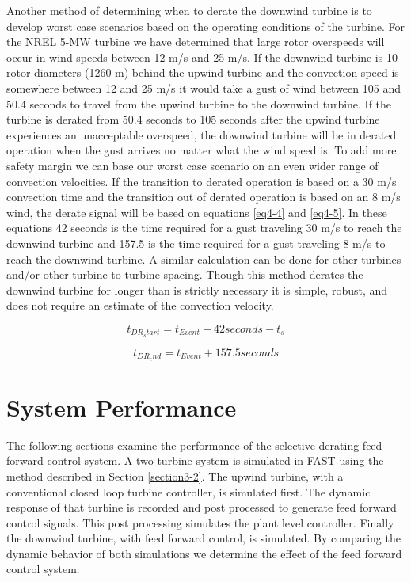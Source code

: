 Another method of determining when to derate the downwind turbine is to develop worst case scenarios based on the operating conditions of the turbine. For the NREL 5-MW turbine we have determined that large rotor overspeeds will occur in wind speeds between 12 m/s and 25 m/s. If the downwind turbine is 10 rotor diameters (1260 m) behind the upwind turbine and the convection speed is somewhere between 12 and 25 m/s it would take a gust of wind between 105 and 50.4 seconds to travel from the upwind turbine to the downwind turbine. If the turbine is derated from 50.4 seconds to 105 seconds after the upwind turbine experiences an unacceptable overspeed, the downwind turbine will be in derated operation when the gust arrives no matter what the wind speed is. To add more safety margin we can base our worst case scenario on an even wider range of convection velocities. If the transition to derated operation is based on a 30 m/s convection time and the transition out of derated operation is based on an 8 m/s wind, the derate signal will be based on equations \ref{eq4-4} and \ref{eq4-5}. In these equations 42 seconds is the time required for a gust traveling 30 m/s to reach the downwind turbine and 157.5 is the time required for a gust traveling 8 m/s to reach the downwind turbine.  A similar calculation can be done for other turbines and/or other turbine to turbine spacing. Though this method derates the downwind turbine for longer than is strictly necessary it is simple, robust, and does not require an estimate of the convection velocity.

\begin{equation}
	t_{DR_start} = t_{Event} + 42 seconds - t_s \label{eq4-4}
\end{equation}

\begin{equation}
	t_{DR_end} = t_{Event} + 157.5 seconds \label{eq4-5}
\end{equation}


\section{System Performance} \label{section4-6}

The following sections examine the performance of the selective derating feed forward control system. A two turbine system is simulated in FAST using the method described in Section \ref{section3-2}. The upwind turbine, with a conventional closed loop turbine controller,  is simulated first. The dynamic response of that turbine is recorded and post processed to generate feed forward control signals. This post processing simulates the plant level controller. Finally the downwind turbine, with feed forward control, is simulated. By comparing the dynamic behavior of both simulations we determine the effect of the feed forward control system.


